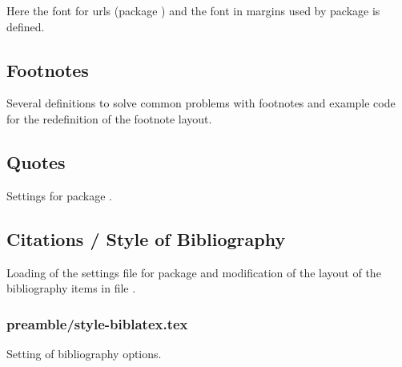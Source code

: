 Here the font for urls (package ) and the font in margins used by package  is defined.


\subsection{Footnotes}
\label{sec:style:footnote}

Several definitions to solve common problems with footnotes and example code for the redefinition of the footnote layout.


\subsection{Quotes}
\label{sec:style:quotes}

Settings for package .


\subsection{Citations / Style of Bibliography}
\label{sec:style:bib}

Loading of the settings file  for package  and modification of the layout of the bibliography items in file .


\subsubsection{preamble/style-biblatex.tex}

Setting of bibliography options.

